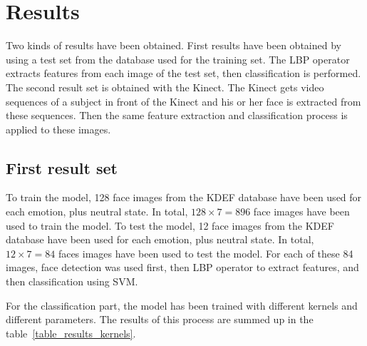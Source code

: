 \chapter{Results}
\label{chap:eval_results}

\noindent Two kinds of results have been obtained. First results have been obtained by using a test set from the database used for the training set. The LBP operator extracts features from each image of the test set, then classification is performed. The second result set is obtained with the Kinect. The Kinect gets video sequences of a subject in front of the Kinect and his or her face is extracted from these sequences. Then the same feature extraction and classification process is applied to these images.
\newline

\section{First result set}

\vspace{\baselineskip}
\noindent To train the model, 128 face images from the KDEF database have been used for each emotion, plus neutral state. In total, $ 128\times7 = 896 $ face images have been used to train the model. To test the model, 12 face images from the KDEF database have been used for each emotion, plus neutral state. In total, $ 12\times7 = 84 $ faces images have been used to test the model. For each of these 84 images, face detection was used first, then LBP operator to extract features, and then classification using SVM.
\newline

\noindent For the classification part, the model has been trained with different kernels and different parameters. The results of this process are summed up in the table~\ref{table_results_kernels}.
\newline

